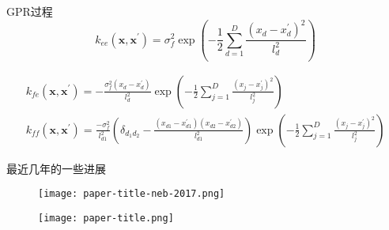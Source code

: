 \documentclass[xcolor=x11names,UTF8]{ctexbeamer}
\begin{document}
\begin{frame}{GPR过程}
\begin{equation}
k_{e e}\left(\boldsymbol{x}, \boldsymbol{x}^{\prime}\right)=\sigma_{f}^{2} \exp \left(-\frac{1}{2} \sum_{d=1}^{D} \frac{\left(x_{d}-x_{d}^{\prime}\right)^{2}}{l_{d}^{2}}\right)
\end{equation}

\begin{equation}
\begin{array}{c}
k_{f e}\left(\boldsymbol{x}, \boldsymbol{x}^{\prime}\right)=-\frac{\sigma_{f}^{2}\left(x_{d}-x_{d}^{\prime}\right)}{l_{d}^{2}} \exp \left(-\frac{1}{2} \sum_{j=1}^{D} \frac{\left(x_{j}-x_{j}^{\prime}\right)^{2}}{l_{j}^{2}}\right) \\
k_{f f}\left(\boldsymbol{x}, \boldsymbol{x}^{\prime}\right)=\frac{-\sigma_{f}^{2}}{l_{d 1}^{2}}\left(\delta_{d_{1} d_{2}}-\frac{\left(x_{d 1}-x_{d 1}^{\prime}\right)\left(x_{d 2}-x_{d 2}^{\prime}\right)}{l_{d 1}^{2}}\right) \exp \left(-\frac{1}{2} \sum_{j=1}^{D} \frac{\left(x_{j}-x_{j}^{\prime}\right)^{2}}{l_{j}^{2}}\right)
\end{array}
\end{equation}

\end{frame}

\begin{frame}{最近几年的一些进展}

  \begin{figure}
      \centering
      \texttt{[image: paper-title-neb-2017.png]}
  \end{figure}

  \begin{figure}
      \centering
      \texttt{[image: paper-title.png]}
  \end{figure}


\end{frame}
\end{document}
